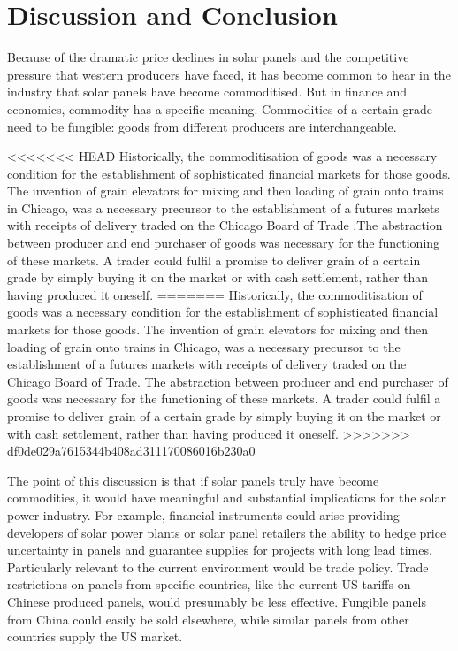 \documentclass[12pt]{article}
\begin{document}
\section{Discussion and Conclusion}

Because of the dramatic price declines in solar panels and the competitive pressure that western producers have faced, it has become common to hear in the industry that solar panels have become commoditised. But in finance and economics, commodity has a specific meaning. Commodities of a certain grade need to be fungible: goods from different producers are interchangeable.

<<<<<<< HEAD
Historically, the commoditisation of goods was a necessary condition for the establishment of sophisticated financial markets for those goods. The invention of grain elevators for mixing and then loading of grain onto trains in Chicago, was a necessary precursor to the establishment of a futures markets with receipts of delivery traded on the Chicago Board of Trade \citep{cronon_natures_1992} .The abstraction between producer and end purchaser of goods was necessary for the functioning of these markets. A trader could fulfil a promise to deliver grain of a certain grade by simply buying it on the market or with cash settlement, rather than having produced it oneself.
=======
Historically, the commoditisation of goods was a necessary condition for the establishment of sophisticated financial markets for those goods. The invention of grain elevators for mixing and then loading of grain onto trains in Chicago, was a necessary precursor to the establishment of a futures markets with receipts of delivery traded on the Chicago Board of Trade.\citep{cronon_natures_1992} The abstraction between producer and end purchaser of goods was necessary for the functioning of these markets. A trader could fulfil a promise to deliver grain of a certain grade by simply buying it on the market or with cash settlement, rather than having produced it oneself.
>>>>>>> df0de029a7615344b408ad311170086016b230a0

 The point of this discussion is that if solar panels truly have become commodities, it would have meaningful and substantial implications for the solar power industry. For example, financial instruments could arise providing developers of solar power plants or solar panel retailers the ability to hedge price uncertainty in panels and guarantee supplies for projects with long lead times. Particularly relevant to the current environment would be trade policy. Trade restrictions on panels from specific countries, like the current US tariffs on Chinese produced panels, would presumably be less effective. Fungible panels from China could easily be sold elsewhere, while similar panels from other countries supply the US market.
\end{document}

